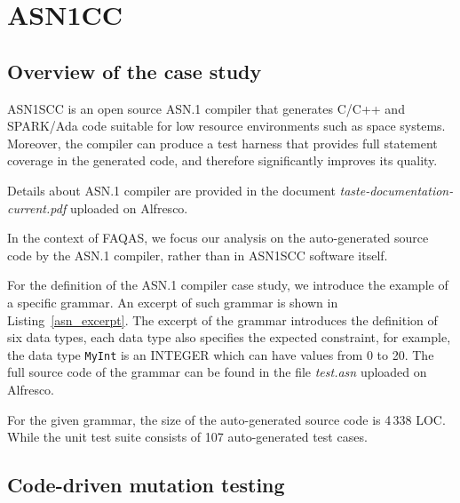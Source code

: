 
\clearpage

\section{ASN1CC}
\label{sec:caseStudies:GSL:ASN1}

\subsection{Overview of the case study}

ASN1SCC is an open source ASN.1 compiler that generates C/C++ and SPARK/Ada code suitable for low resource environments such as space systems. Moreover, the compiler can produce a test harness that provides full statement coverage in the generated code, and therefore significantly improves its quality.

Details about ASN.1 compiler are provided in the document \emph{taste-documentation-current.pdf} uploaded on Alfresco.

In the context of FAQAS, we focus our analysis on the auto-generated source code by the ASN.1 compiler, rather than in ASN1SCC software itself.

For the definition of the ASN.1 compiler case study, we introduce the example of a specific grammar. An excerpt of such grammar is shown in Listing~\ref{asn_excerpt}. 
The excerpt of the grammar introduces the definition of six data types, each data type also specifies the expected constraint, for example, the data type \texttt{MyInt} is an INTEGER which can have values from 0 to 20. The full source code of the grammar can be found in the file \emph{test.asn} uploaded on Alfresco.

For the given grammar, the size of the auto-generated source code is 4\,338 LOC. While the unit test suite consists of 107 auto-generated test cases.



\subsection{Code-driven mutation testing}




